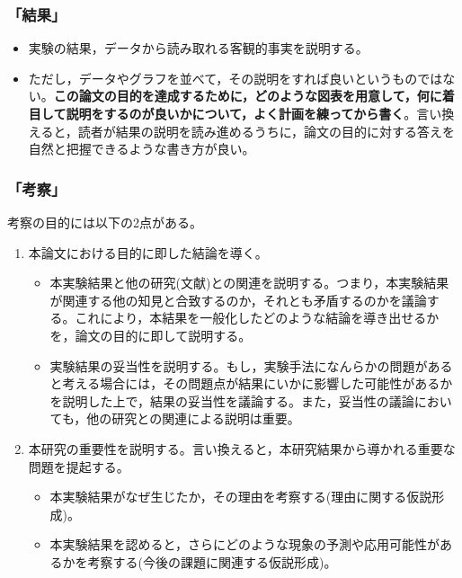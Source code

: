 \documentclass[12pt, ]{jsarticle}
\providecommand{\tightlist}{%
   \setlength{\itemsep}{0pt}\setlength{\parskip}{0pt}}
\begin{document}
\hypertarget{ux7d50ux679c}{%
\subsubsection{「結果」}\label{ux7d50ux679c}}

\begin{itemize}
\tightlist
\item
  実験の結果，データから読み取れる客観的事実を説明する。
\item
  ただし，データやグラフを並べて，その説明をすれば良いというものではない。\textbf{この論文の目的を達成するために，どのような図表を用意して，何に着目して説明をするのが良いかについて，よく計画を練ってから書く}。言い換えると，読者が結果の説明を読み進めるうちに，論文の目的に対する答えを自然と把握できるような書き方が良い。
\end{itemize}

\hypertarget{ux8003ux5bdf}{%
\subsubsection{「考察」}\label{ux8003ux5bdf}}

考察の目的には以下の2点がある。

\begin{enumerate}
\tightlist
\item
  本論文における目的に即した結論を導く。

  \begin{itemize}
  \tightlist
  \item
    本実験結果と他の研究(文献)との関連を説明する。つまり，本実験結果が関連する他の知見と合致するのか，それとも矛盾するのかを議論する。これにより，本結果を一般化したどのような結論を導き出せるかを，論文の目的に即して説明する。
  \item
    実験結果の妥当性を説明する。もし，実験手法になんらかの問題があると考える場合には，その問題点が結果にいかに影響した可能性があるかを説明した上で，結果の妥当性を議論する。また，妥当性の議論においても，他の研究との関連による説明は重要。
  \end{itemize}
\item
  本研究の重要性を説明する。言い換えると，本研究結果から導かれる重要な問題を提起する。

  \begin{itemize}
  \tightlist
  \item
    本実験結果がなぜ生じたか，その理由を考察する(理由に関する仮説形成)。
  \item
    本実験結果を認めると，さらにどのような現象の予測や応用可能性があるかを考察する(今後の課題に関連する仮説形成)。
  \end{itemize}
\end{enumerate}
\end{document}
